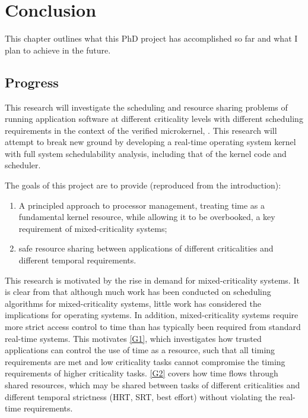 \chapter{Conclusion}
\label{chap:conclusion}

This chapter outlines what this PhD project has accomplished so far and what I plan to achieve in the future.

\section{Progress}

This research will investigate the scheduling and resource sharing problems of running application software at different criticality levels with different scheduling requirements in the context of the verified microkernel, \selfour.
This research will attempt to break new ground by developing a real-time operating system kernel with full system schedulability analysis, including that of the kernel code and scheduler.

The goals of this project are to provide (reproduced from the introduction):

\begin{enumerate}[label=\textbf{G\arabic*}]
  \item \label{G1} A principled approach to processor management, treating time as a fundamental kernel resource, while allowing it to be overbooked, a key requirement of mixed-criticality systems;
  \item \label{G2} safe resource sharing between applications of different criticalities and different temporal requirements.
\end{enumerate}

This research is motivated by the rise in demand for mixed-criticality systems.
It is clear from  that although much work has been conducted on scheduling algorithms for mixed-criticality systems, little work has considered the implications for operating systems.
In addition, mixed-criticality systems require more strict access control to time than has typically been required from standard real-time systems.
This motivates \ref{G1}, which investigates how trusted applications can control the use of time as a resource, such that all timing requirements are met and low criticality tasks cannot compromise the timing requirements of higher criticality tasks.
\ref{G2} covers how time flows through shared resources, which may be shared between tasks of different criticalities and different temporal strictness (\gls{HRT}, \gls{SRT}, best effort) without violating the real-time requirements.

